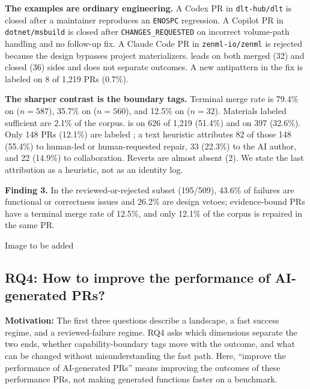 \textbf{The examples are ordinary engineering.} A Codex PR in \texttt{dlt-hub/dlt} is closed after a maintainer reproduces an \texttt{ENOSPC} regression. A Copilot PR in \texttt{dotnet/msbuild} is closed after \texttt{CHANGES\_REQUESTED} on incorrect volume-path handling and no follow-up fix. A Claude Code PR in \texttt{zenml-io/zenml} is rejected because the design bypasses project materializers.  leads on both merged (32) and closed (36) sides and does not separate outcomes. A new antipattern in the fix is labeled on 8 of 1{,}219 PRs (0.7\%).

\textbf{The sharper contrast is the boundary tags.} Terminal merge rate is 79.4\% on  (\(n=587\)), 35.7\% on  (\(n=560\)), and 12.5\% on  (\(n=32\)). Materials labeled sufficient are 2.1\% of the corpus.  is  on 626 of 1{,}219 (51.4\%) and  on 397 (32.6\%). Only 148 PRs (12.1\%) are labeled ; a text heuristic attributes 82 of those 148 (55.4\%) to human-led or human-requested repair, 33 (22.3\%) to the AI author, and 22 (14.9\%) to collaboration. Reverts are almost absent (2). We state the last attribution as a heuristic, not as an identity log.

\begin{center}
\begin{tcolorbox}
\textbf{Finding 3.} In the reviewed-or-rejected subset (195/509), 43.6\% of failures are functional or correctness issues and 26.2\% are design vetoes; evidence-bound PRs have a terminal merge rate of 12.5\%, and only 12.1\% of the corpus is repaired in the same PR.
\end{tcolorbox}
\end{center}

{\color{red}Image to be added}

\subsection{RQ4: How to improve the performance of AI-generated PRs?}
\label{RQ4}

\noindent\textbf{Motivation:} The first three questions describe a landscape, a fast success regime, and a reviewed-failure regime. RQ4 asks which dimensions separate the two ends, whether capability-boundary tags move with the outcome, and what can be changed without misunderstanding the fast path. Here, “improve the performance of AI-generated PRs” means improving the outcomes of these performance PRs, not making generated functions faster on a benchmark.

